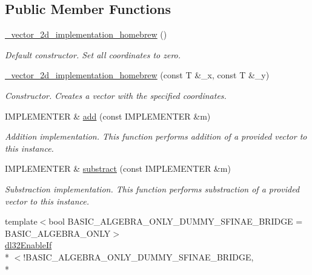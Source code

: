 \subsection*{Public Member Functions}
\begin{DoxyCompactItemize}
\item 
\hyperlink{struct__vector__2d__implementation__homebrew_a1c37a184957c4b164aeab062cf3aebad}{\-\_\-vector\-\_\-2d\-\_\-implementation\-\_\-homebrew} ()
\begin{DoxyCompactList}\small\item\em Default constructor. Set all coordinates to zero. \end{DoxyCompactList}\item 
\hyperlink{struct__vector__2d__implementation__homebrew_a9c97981bedd38886f1101aa3dbcff399}{\-\_\-vector\-\_\-2d\-\_\-implementation\-\_\-homebrew} (const T \&\-\_\-x, const T \&\-\_\-y)
\begin{DoxyCompactList}\small\item\em Constructor. Creates a vector with the specified coordinates. \end{DoxyCompactList}\item 
I\-M\-P\-L\-E\-M\-E\-N\-T\-E\-R \& \hyperlink{struct__vector__2d__implementation__homebrew_aa0fe8caf65a4d7db9fa29cab5a11182f}{add} (const I\-M\-P\-L\-E\-M\-E\-N\-T\-E\-R \&m)
\begin{DoxyCompactList}\small\item\em Addition implementation. This function performs addition of a provided vector to this instance. \end{DoxyCompactList}\item 
I\-M\-P\-L\-E\-M\-E\-N\-T\-E\-R \& \hyperlink{struct__vector__2d__implementation__homebrew_a7dfe5da15568c7a6eeda25c5801774e1}{substract} (const I\-M\-P\-L\-E\-M\-E\-N\-T\-E\-R \&m)
\begin{DoxyCompactList}\small\item\em Substraction implementation. This function performs substraction of a provided vector to this instance. \end{DoxyCompactList}\item 
{\footnotesize template$<$bool B\-A\-S\-I\-C\-\_\-\-A\-L\-G\-E\-B\-R\-A\-\_\-\-O\-N\-L\-Y\-\_\-\-D\-U\-M\-M\-Y\-\_\-\-S\-F\-I\-N\-A\-E\-\_\-\-B\-R\-I\-D\-G\-E = B\-A\-S\-I\-C\-\_\-\-A\-L\-G\-E\-B\-R\-A\-\_\-\-O\-N\-L\-Y$>$ }\\\hyperlink{structdl32_enable_if}{dl32\-Enable\-If}\\*
$<$!B\-A\-S\-I\-C\-\_\-\-A\-L\-G\-E\-B\-R\-A\-\_\-\-O\-N\-L\-Y\-\_\-\-D\-U\-M\-M\-Y\-\_\-\-S\-F\-I\-N\-A\-E\-\_\-\-B\-R\-I\-D\-G\-E, \\*

\end{DoxyCompactItemize}
